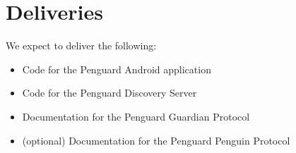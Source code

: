 \documentclass{report}
\begin{document}



\section{Deliveries}

We expect to deliver the following:

\begin{itemize}
    \item Code for the Penguard Android application
    \item Code for the Penguard Discovery Server
    \item Documentation for the Penguard Guardian Protocol
    \item (optional) Documentation for the Penguard Penguin Protocol
\end{itemize}
\end{document}
